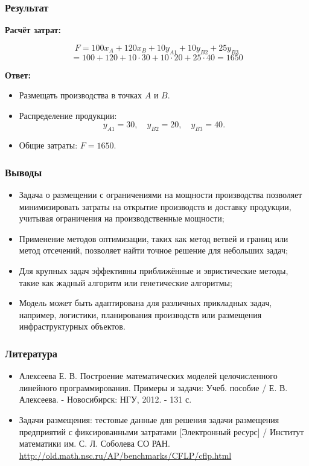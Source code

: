 \documentclass[12pt]{beamer}
\begin{document}
    \begin{frame}
        \frametitle{Результат}
    
        \textbf{Расчёт затрат:}

        $$F = 100x_A + 120x_B + 10y_{A1} + 10y_{B2} + 25y_{B3}$$
        $$= 100 + 120 + 10 \cdot 30 + 10 \cdot 20 + 25 \cdot 40 = 1650$$

        \textbf{Ответ:}
        \begin{itemize}
            \item Размещать производства в точках \( A \) и \( B \).
            \item Распределение продукции:
            \[
            y_{A1} = 30, \quad y_{B2} = 20, \quad y_{B3} = 40.
            \]
            \item Общие затраты: \( F = 1650 \).
        \end{itemize}
    
    \end{frame}

    \begin{frame}
        \frametitle{Выводы}
    
        \begin{itemize}
            \item Задача о размещении с ограничениями на мощности производства позволяет минимизировать затраты на открытие производств и доставку продукции, учитывая ограничения на производственные мощности;
            \item Применение методов оптимизации, таких как метод ветвей и границ или метод отсечений, позволяет найти точное решение для небольших задач;
            \item Для крупных задач эффективны приближённые и эвристические методы, такие как жадный алгоритм или генетические алгоритмы;
            \item Модель может быть адаптирована для различных прикладных задач, например, логистики, планирования производств или размещения инфраструктурных объектов.
        \end{itemize}
    
    \end{frame}

    \begin{frame}
        \frametitle{Литература}

        \begin{itemize}
            \item Алексеева Е. В. Построение математических моделей целочисленного линейного программирования. Примеры и задачи: Учеб. пособие / Е. В. Алексеева. - Новосибирск: НГУ, 2012. - 131 с.
            \item Задачи размещения: тестовые данные для решения задачи размещения предприятий с фиксированными затратами [Электронный ресурс] / Институт математики им. С. Л. Соболева СО РАН. \url{http://old.math.nsc.ru/AP/benchmarks/CFLP/cflp.html}
        \end{itemize}

    \end{frame}
	
\end{document}
